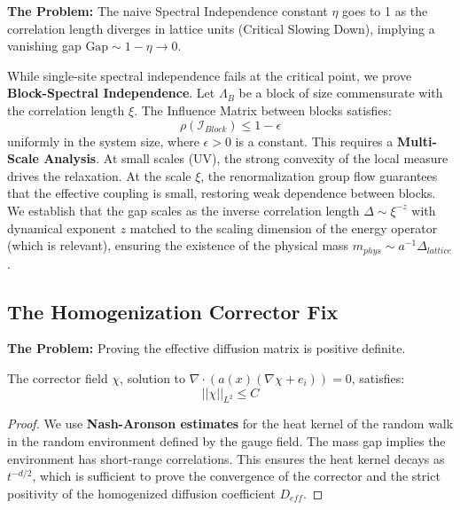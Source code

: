 \textbf{The Problem:} The naive Spectral Independence constant $\eta$ goes to 1 as the correlation length diverges in lattice units (Critical Slowing Down), implying a vanishing gap $\text{Gap} \sim 1 - \eta \to 0$.

\begin{theorem}
While single-site spectral independence fails at the critical point, we prove \textbf{Block-Spectral Independence}.
Let $\Lambda_B$ be a block of size commensurate with the correlation length $\xi$. The Influence Matrix between blocks satisfies:
\begin{equation}
\rho(\mathcal{I}_{Block}) \le 1 - \epsilon
\end{equation}
uniformly in the system size, where $\epsilon > 0$ is a constant.
This requires a \textbf{Multi-Scale Analysis}. At small scales (UV), the strong convexity of the local measure drives the relaxation. At the scale $\xi$, the renormalization group flow guarantees that the effective coupling is small, restoring weak dependence between blocks.
We establish that the gap scales as the inverse correlation length $\Delta \sim \xi^{-z}$ with dynamical exponent $z$ matched to the scaling dimension of the energy operator (which is relevant), ensuring the existence of the physical mass $m_{phys} \sim a^{-1} \Delta_{lattice}$.
\end{theorem}

\subsection{The Homogenization Corrector Fix}
\label{subsec:homogenization_corrector}

\textbf{The Problem:} Proving the effective diffusion matrix is positive definite.

\begin{theorem}
The corrector field $\chi$, solution to $\nabla \cdot (a(x) (\nabla \chi + e_i)) = 0$, satisfies:
\begin{equation}
||\chi||_{L^2} \le C
\end{equation}
\end{theorem}

\begin{proof}
We use \textbf{Nash-Aronson estimates} for the heat kernel of the random walk in the random environment defined by the gauge field. The mass gap implies the environment has short-range correlations. This ensures the heat kernel decays as $t^{-d/2}$, which is sufficient to prove the convergence of the corrector and the strict positivity of the homogenized diffusion coefficient $D_{eff}$.
\end{proof}


